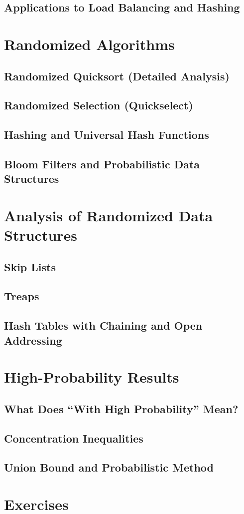 \subsection{Applications to Load Balancing and Hashing}

\section{Randomized Algorithms}
\subsection{Randomized Quicksort (Detailed Analysis)}
\subsection{Randomized Selection (Quickselect)}
\subsection{Hashing and Universal Hash Functions}
\subsection{Bloom Filters and Probabilistic Data Structures}

\section{Analysis of Randomized Data Structures}
\subsection{Skip Lists}
\subsection{Treaps}
\subsection{Hash Tables with Chaining and Open Addressing}

\section{High-Probability Results}
\subsection{What Does ``With High Probability'' Mean?}
\subsection{Concentration Inequalities}
\subsection{Union Bound and Probabilistic Method}

\section{Exercises}